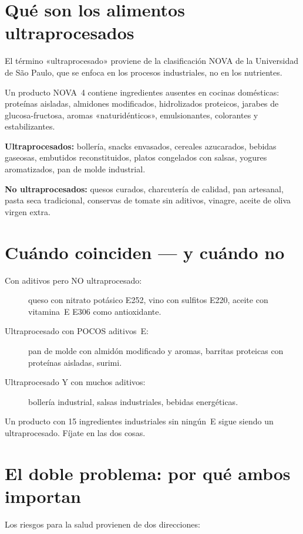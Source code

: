 \documentclass[a5paper,12pt,oneside,openany]{book}
\newcommand{\boxinfo}[2]{%
  \begin{tcolorbox}[cajabase,
    colback=azulinfo!8!white, colframe=azulinfo, title={#1}]
  #2\end{tcolorbox}}
\begin{document}
\section{Qué son los alimentos ultraprocesados}

El término «ultraprocesado» proviene de la clasificación NOVA de la Universidad
de São Paulo, que se enfoca en los procesos industriales, no en los nutrientes.

Un producto NOVA~4 contiene ingredientes ausentes en cocinas domésticas: proteínas
aisladas, almidones modificados, hidrolizados proteicos, jarabes de
glucosa-fructosa, aromas «naturidénticos», emulsionantes, colorantes y
estabilizantes.

\textbf{Ultraprocesados:} bollería, snacks envasados, cereales azucarados,
bebidas gaseosas, embutidos reconstituidos, platos congelados con salsas,
yogures aromatizados, pan de molde industrial.

\textbf{No ultraprocesados:} quesos curados, charcutería de calidad, pan artesanal,
pasta seca tradicional, conservas de tomate sin aditivos, vinagre, aceite
de oliva virgen extra.

\section{Cuándo coinciden --- y cuándo no}

\begin{description}
  \item[Con aditivos pero NO ultraprocesado:] queso con nitrato potásico E252,
    vino con sulfitos E220, aceite con vitamina~E E306 como antioxidante.
  \item[Ultraprocesado con POCOS aditivos~E:] pan de molde con almidón
    modificado y aromas, barritas proteicas con proteínas aisladas, surimi.
  \item[Ultraprocesado Y con muchos aditivos:] bollería industrial, salsas
    industriales, bebidas energéticas.
\end{description}

\boxinfo{Conclusión}{Un producto con 15 ingredientes industriales sin ningún~E
sigue siendo un ultraprocesado. Fíjate en las dos cosas.}

\section{El doble problema: por qué ambos importan}

Los riesgos para la salud provienen de dos direcciones:
\end{document}
